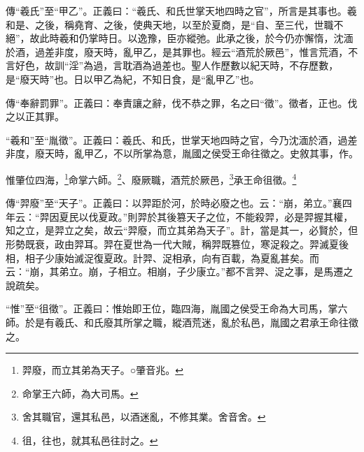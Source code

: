 {\noindent\zhuan{}\fzbyks 傳“羲氏”至“甲乙”。正義曰：“羲氏、和氏世掌天地四時之官”，所言是其事也。羲和是、之後，稱堯育、之後，使典天地，以至於夏商，是“自、至三代，世職不絕”，故此時羲和仍掌時日。以逸豫，臣亦縱弛。此承之後，於今仍亦懈惰，沈湎於酒，過差非度，廢天時，亂甲乙，是其罪也。經云“酒荒於厥邑”，惟言荒酒，不言好色，故訓“淫”為過，言耽酒為過差也。聖人作歷數以紀天時，不存歷數，是“廢天時”也。日以甲乙為紀，不知日食，是“亂甲乙”也。 \par}

{\noindent\zhuan{}\fzbyks 傳“奉辭罰罪”。正義曰：奉責讓之辭，伐不恭之罪，名之曰“徵”。徵者，正也。伐之以正其罪。 \par}

{\noindent\shu{}\fzkt “羲和”至“胤徵”。正義曰：羲氏、和氏，世掌天地四時之官，今乃沈湎於酒，過差非度，廢天時，亂甲乙，不以所掌為意，胤國之侯受王命往徵之。史敘其事，作。 \par}

惟肇位四海，\footnote{羿廢，而立其弟為天子。○肇音兆。}命掌六師。\footnote{命掌王六師，為大司馬。}、廢厥職，酒荒於厥邑，\footnote{舍其職官，還其私邑，以酒迷亂，不修其業。舍音舍。}承王命徂徵。\footnote{徂，往也，就其私邑往討之。}


{\noindent\zhuan{}\fzbyks 傳“羿廢”至“天子”。正義曰：以羿距於河，於時必廢之也。云：“崩，弟立。”襄四年云：“羿因夏民以伐夏政。”則羿於其後篡天子之位，不能殺羿，必是羿握其權，知之立，是羿立之矣，故云“羿廢，而立其弟為天子”。計，當是其一，必賢於，但形勢既衰，政由羿耳。羿在夏世為一代大賊，稱羿既篡位，寒浞殺之。羿滅夏後相，相子少康始滅浞復夏政。計羿、浞相承，向有百載，為夏亂甚矣。而云：“崩，其弟立。崩，子相立。相崩，子少康立。”都不言羿、浞之事，是馬遷之說疏矣。 \par}

{\noindent\shu{}\fzkt “惟”至“徂徵”。正義曰：惟始即王位，臨四海，胤國之侯受王命為大司馬，掌六師。於是有羲氏、和氏廢其所掌之職，縱酒荒迷，亂於私邑，胤國之君承王命往徵之。 \par}


